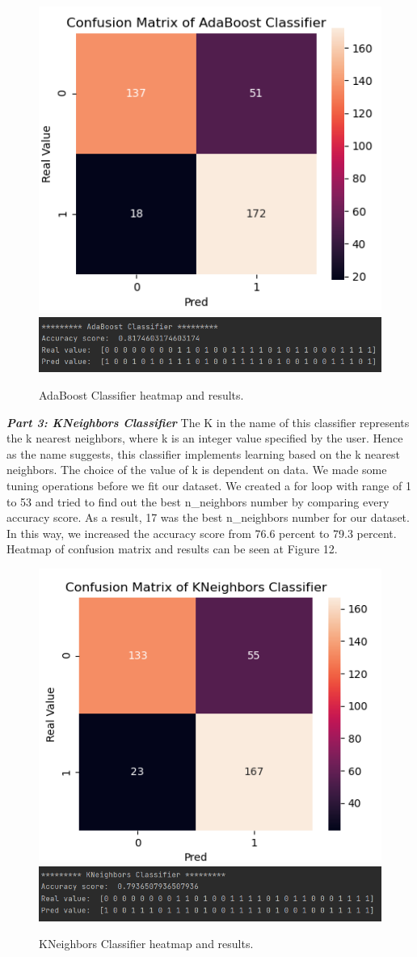 \documentclass[onecolumn]{article}
\begin{document}
\begin{figure}[h]
\centering
{\centering
    \includegraphics[width=.49\linewidth]{fig/fig_abc2.png}
        \label{figure13}}
{\centering
    \includegraphics[width=.49\linewidth]{fig/fig_abc1.png}
        \label{figure14}}
\caption{\label{AdaBoost Classifier}AdaBoost Classifier heatmap and results.}
\end{figure}

\textbf{\emph{Part 3: KNeighbors Classifier}}\bigbreak
The K in the name of this classifier represents the k nearest neighbors, where k is an integer value specified by the user. Hence as the name suggests, this classifier implements learning based on the k nearest neighbors. The choice of the value of k is dependent on data. We made some tuning operations before we fit our dataset. We created a for loop with range of 1 to 53 and tried to find out the best n\_neighbors number by comparing every accuracy score. As a result, 17 was the best n\_neighbors number for our dataset. In this way, we increased the accuracy score from 76.6 percent to 79.3 percent. Heatmap of confusion matrix and results can be seen at Figure 12.\bigbreak

\begin{figure}[h]
\centering
{\centering
    \includegraphics[width=.49\linewidth]{fig/fig_knc2.png}
        \label{figure15}}
{\centering
    \includegraphics[width=.49\linewidth]{fig/fig_knc1.png}
        \label{figure16}}
\caption{\label{KNeighbors Classifier}KNeighbors Classifier heatmap and results.}
\end{figure}
\end{document}
